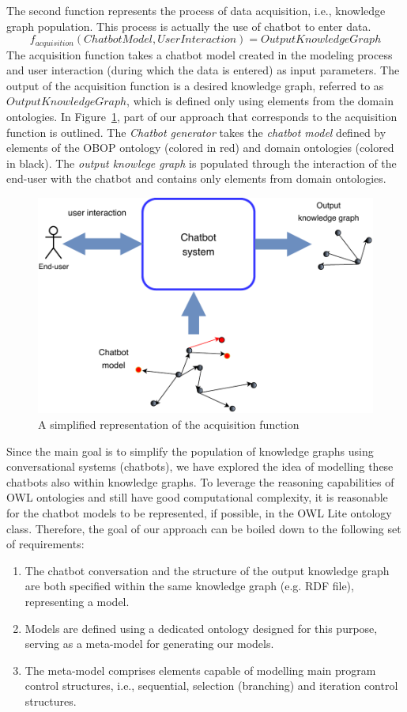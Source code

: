 \documentclass[runningheads]{llncs}
\begin{document}
The second function represents the process of data acquisition, i.e., knowledge graph population. This process is actually the use of chatbot to enter data.
$$f_{acquisition}(ChatbotModel, UserInteraction) = OutputKnowledgeGraph$$
The acquisition function takes a chatbot model created in the modeling process and user interaction (during which the data is entered) as input parameters. The output of the acquisition function is a desired knowledge graph, referred to as $OutputKnowledgeGraph$, which is defined only using elements from the domain ontologies. In Figure~\ref{fig:chatbotsystem}, part of our approach that corresponds to the acquisition function is outlined. The \textit{Chatbot generator} takes the \textit{chatbot model} defined by elements of the OBOP ontology (colored in red) and domain ontologies (colored in black). The \textit{output knowlege graph} is populated through the interaction of the end-user with the chatbot and contains only elements from domain ontologies.
\begin{figure}[H]
  \centering
  \includegraphics[width=0.9\linewidth]{img/chatbot-system}
  \caption{A simplified representation of the acquisition function}
  \label{fig:chatbotsystem}
\end{figure}
Since the main goal is to simplify the population of knowledge graphs using conversational systems (chatbots), we have explored the idea of modelling these chatbots also within knowledge graphs. To leverage the reasoning capabilities of OWL ontologies and still have good computational complexity, it is reasonable for the chatbot models to be represented, if possible, in the OWL Lite ontology class. Therefore, the goal of our approach can be boiled down to the following set of requirements:
\begin{enumerate}
\item
  The chatbot conversation and the structure of the output knowledge graph are both specified within the same knowledge graph (e.g. RDF file), representing a model.
\item
  Models are defined using a dedicated ontology designed for this purpose, serving as a meta-model for generating our models.
\item
The meta-model comprises elements capable of modelling main program control structures, i.e., sequential, selection (branching) and iteration control structures. 
\end{enumerate}
\end{document}
